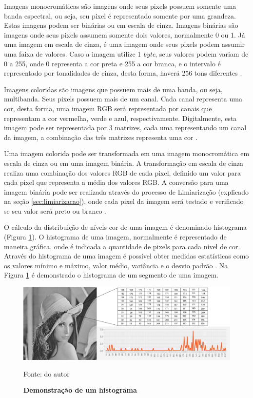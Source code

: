 \documentclass[
	12pt,				%
	oneside,			%
	a4paper,			%
	english,			%
	french,				%
	spanish,			%
	brazil,				%
	]{abntex2}
\begin{document}
Imagens monocromáticas são imagens onde seus pixels possuem somente uma banda espectral, ou seja, seu pixel é representado somente por uma grandeza. Estas imagens podem ser binárias ou em escala de cinza. Imagens binárias são imagens onde seus pixels assumem somente dois valores, normalmente 0 ou 1. Já uma imagem em escala de cinza, é uma imagem onde seus pixels podem assumir uma faixa de valores. Caso a imagem utilize 1 \textit{byte}, seus valores podem variam de 0 a 255, onde 0 representa a cor preta e 255 a cor branca, e o intervalo é representado por tonalidades de cinza, desta forma, haverá 256 tons diferentes \cite{conciAzevedoLeta:2008}.

Imagens coloridas são imagens que possuem mais de uma banda, ou seja, multibanda. Seus pixels possuem mais de um canal. Cada canal representa uma cor, desta forma, uma imagem RGB será representada por canais que representam a cor vermelha, verde e azul, respectivamente. Digitalmente, esta imagem pode ser representada por 3 matrizes, cada uma representando um canal da imagem, a combinação das três matrizes representa uma cor \cite{conciAzevedoLeta:2008}.

Uma imagem colorida pode ser transformada em uma imagem monocromática em escala de cinza ou em uma imagem binária. A transformação em escala de cinza realiza uma combinação dos valores RGB de cada pixel, definido um valor para cada pixel que representa a média dos valores RGB. A conversão para uma imagem binária pode ser realizada através do processo de Limiarização (explicado na seção \ref{sec:limiarizacao}), onde cada pixel da imagem será testado e verificado se seu valor será preto ou branco \cite{mossmann2010extraccao}.

O cálculo da distribuição de níveis cor de uma imagem é denominado histograma (Figura \ref{fig:histograma}). O histograma de uma imagem, normalmente é representado de maneira gráfica, onde é indicada a quantidade de pixels para cada nível de cor. Através do histograma de uma imagem é possível obter medidas estatísticas como os valores mínimo e máximo, valor médio, variância e o desvio padrão \cite{gonzalesWoods:2008}. Na Figura \ref{fig:histograma} é demonstrado o histograma de um segmento de uma imagem. 

\begin{figure}[ht]
\centering
\caption{\textbf{Demonstração de um histograma}}
\includegraphics[width=1\textwidth]{imagens/histograma.png}
\label{fig:histograma}

Fonte: do autor
\end{figure}
\end{document}
